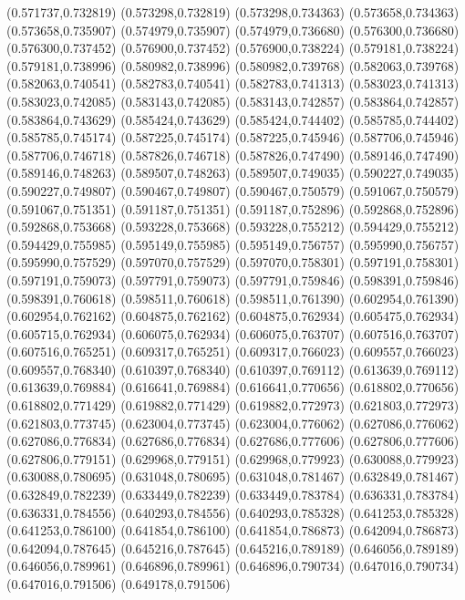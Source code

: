 (0.571737,0.732819)
(0.573298,0.732819)
(0.573298,0.734363)
(0.573658,0.734363)
(0.573658,0.735907)
(0.574979,0.735907)
(0.574979,0.736680)
(0.576300,0.736680)
(0.576300,0.737452)
(0.576900,0.737452)
(0.576900,0.738224)
(0.579181,0.738224)
(0.579181,0.738996)
(0.580982,0.738996)
(0.580982,0.739768)
(0.582063,0.739768)
(0.582063,0.740541)
(0.582783,0.740541)
(0.582783,0.741313)
(0.583023,0.741313)
(0.583023,0.742085)
(0.583143,0.742085)
(0.583143,0.742857)
(0.583864,0.742857)
(0.583864,0.743629)
(0.585424,0.743629)
(0.585424,0.744402)
(0.585785,0.744402)
(0.585785,0.745174)
(0.587225,0.745174)
(0.587225,0.745946)
(0.587706,0.745946)
(0.587706,0.746718)
(0.587826,0.746718)
(0.587826,0.747490)
(0.589146,0.747490)
(0.589146,0.748263)
(0.589507,0.748263)
(0.589507,0.749035)
(0.590227,0.749035)
(0.590227,0.749807)
(0.590467,0.749807)
(0.590467,0.750579)
(0.591067,0.750579)
(0.591067,0.751351)
(0.591187,0.751351)
(0.591187,0.752896)
(0.592868,0.752896)
(0.592868,0.753668)
(0.593228,0.753668)
(0.593228,0.755212)
(0.594429,0.755212)
(0.594429,0.755985)
(0.595149,0.755985)
(0.595149,0.756757)
(0.595990,0.756757)
(0.595990,0.757529)
(0.597070,0.757529)
(0.597070,0.758301)
(0.597191,0.758301)
(0.597191,0.759073)
(0.597791,0.759073)
(0.597791,0.759846)
(0.598391,0.759846)
(0.598391,0.760618)
(0.598511,0.760618)
(0.598511,0.761390)
(0.602954,0.761390)
(0.602954,0.762162)
(0.604875,0.762162)
(0.604875,0.762934)
(0.605475,0.762934)
(0.605715,0.762934)
(0.606075,0.762934)
(0.606075,0.763707)
(0.607516,0.763707)
(0.607516,0.765251)
(0.609317,0.765251)
(0.609317,0.766023)
(0.609557,0.766023)
(0.609557,0.768340)
(0.610397,0.768340)
(0.610397,0.769112)
(0.613639,0.769112)
(0.613639,0.769884)
(0.616641,0.769884)
(0.616641,0.770656)
(0.618802,0.770656)
(0.618802,0.771429)
(0.619882,0.771429)
(0.619882,0.772973)
(0.621803,0.772973)
(0.621803,0.773745)
(0.623004,0.773745)
(0.623004,0.776062)
(0.627086,0.776062)
(0.627086,0.776834)
(0.627686,0.776834)
(0.627686,0.777606)
(0.627806,0.777606)
(0.627806,0.779151)
(0.629968,0.779151)
(0.629968,0.779923)
(0.630088,0.779923)
(0.630088,0.780695)
(0.631048,0.780695)
(0.631048,0.781467)
(0.632849,0.781467)
(0.632849,0.782239)
(0.633449,0.782239)
(0.633449,0.783784)
(0.636331,0.783784)
(0.636331,0.784556)
(0.640293,0.784556)
(0.640293,0.785328)
(0.641253,0.785328)
(0.641253,0.786100)
(0.641854,0.786100)
(0.641854,0.786873)
(0.642094,0.786873)
(0.642094,0.787645)
(0.645216,0.787645)
(0.645216,0.789189)
(0.646056,0.789189)
(0.646056,0.789961)
(0.646896,0.789961)
(0.646896,0.790734)
(0.647016,0.790734)
(0.647016,0.791506)
(0.649178,0.791506)
